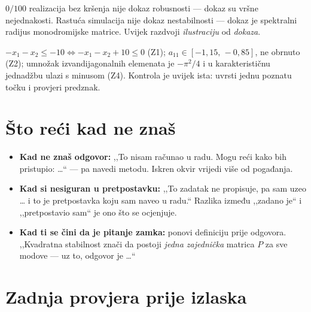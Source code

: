 \begin{zamka}
$0/100$ realizacija bez kršenja nije dokaz robusnosti --- dokaz su vršne
nejednakosti. Rastuća simulacija nije dokaz nestabilnosti --- dokaz je spektralni
radijus monodromijske matrice. Uvijek razdvoji \emph{ilustraciju} od
\emph{dokaza}.
\end{zamka}

\begin{zamka}
$-x_1-x_2 \leq -10 \Leftrightarrow -x_1-x_2+10 \leq 0$ (Z1);
$a_{11} \in [-1{,}15,\,-0{,}85]$, ne obrnuto (Z2); umnožak izvandijagonalnih
elemenata je $-\pi^2/4$ i u karakterističnu jednadžbu ulazi s minusom (Z4).
Kontrola je uvijek ista: uvrsti jednu poznatu točku i provjeri predznak.
\end{zamka}

\section{Što reći kad ne znaš}
\label{sec:pod-ne-znam}

\begin{izgovor}
\begin{itemize}[leftmargin=*]
  \item \textbf{Kad ne znaš odgovor:} ,,To nisam računao u radu. Mogu reći kako
        bih pristupio: \dots`` --- pa navedi metodu. Iskren okvir vrijedi više od
        pogađanja.
  \item \textbf{Kad si nesiguran u pretpostavku:} ,,To zadatak ne propisuje, pa
        sam uzeo \dots{} i to je pretpostavka koju sam naveo u radu.`` Razlika
        između ,,zadano je`` i ,,pretpostavio sam`` je ono što se ocjenjuje.
  \item \textbf{Kad ti se čini da je pitanje zamka:} ponovi definiciju prije
        odgovora. ,,Kvadratna stabilnost znači da postoji \emph{jedna zajednička}
        matrica $P$ za sve modove --- uz to, odgovor je \dots``
\end{itemize}
\end{izgovor}

\section{Zadnja provjera prije izlaska}
\label{sec:pod-checklist}

